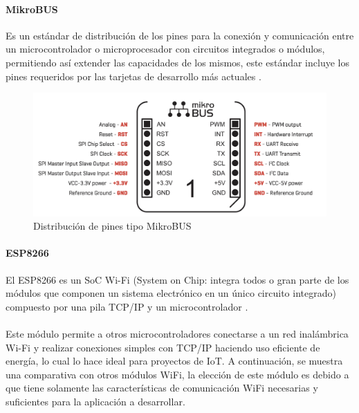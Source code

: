 \paragraph{MikroBUS}
Es un estándar de distribución de los pines para la conexión y comunicación entre un microcontrolador o microprocesador con circuitos integrados o módulos, permitiendo así extender las capacidades de los mismos, este estándar incluye los pines requeridos por las tarjetas de desarrollo más actuales \citep{MarcoTeorico5}.
\begin{figure}[H]
	\centering
	\includegraphics[scale=.25]{Capitulo2/images/mikrobus.png}
	\caption{Distribución de pines tipo MikroBUS}
	\label{fig:diagrama_dispensador}
\end{figure}
\paragraph{}

\paragraph{ESP8266}
El ESP8266 es un SoC Wi-Fi \citep{MarcoTeorico7} (System on Chip: integra todos o gran parte de los módulos que componen un sistema electrónico en un único circuito integrado) compuesto por una pila TCP/IP y un microcontrolador \citep{MarcoTeorico8}.
\paragraph{}

Este módulo permite a otros microcontroladores conectarse a un red inalámbrica Wi-Fi y realizar conexiones simples con TCP/IP haciendo uso eficiente de energía, lo cual lo hace ideal para proyectos de IoT. A continuación, se muestra una comparativa con otros módulos WiFi, la elección de este módulo es debido a que tiene solamente las características de comunicación WiFi necesarias y suficientes para la aplicación a desarrollar.

